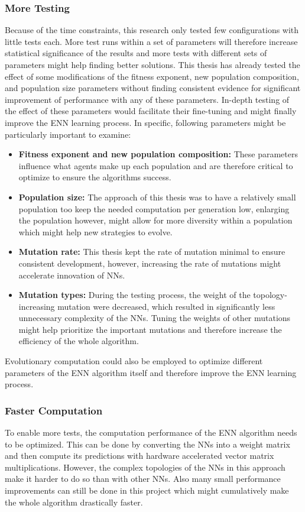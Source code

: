 \subsubsection{More Testing}
Because of the time constraints, this research only tested few configurations with little tests each.
More test runs within a set of parameters will therefore increase statistical significance of the results and more tests with different sets of parameters might help finding better solutions.
This thesis has already tested the effect of some modifications of the fitness exponent, new population composition, and population size parameters without finding consistent evidence for significant improvement of performance with any of these parameters.
In-depth testing of the effect of these parameters would facilitate their fine-tuning and might finally improve the ENN learning process.
In specific, following parameters might be particularly important to examine:
\begin{itemize}
    \item \textbf{Fitness exponent and new population composition:} These parameters influence what agents make up each population and are therefore critical to optimize to ensure the algorithms success.
    \item \textbf{Population size:} The approach of this thesis was to have a relatively small population too keep the needed computation per generation low, enlarging the population however, might allow for more diversity within a population which might help new strategies to evolve.
    \item \textbf{Mutation rate:} This thesis kept the rate of mutation minimal to ensure consistent development, however, increasing the rate of mutations might accelerate innovation of NNs.
    \item \textbf{Mutation types:} During the testing process, the weight of the topology-increasing mutation were decreased, which resulted in significantly less unnecessary complexity of the NNs.
    Tuning the weights of other mutations might help prioritize the important mutations and therefore increase the efficiency of the whole algorithm.
\end{itemize}
Evolutionary computation could also be employed to optimize different parameters of the ENN algorithm itself and therefore improve the ENN learning process.

\subsubsection{Faster Computation}
To enable more tests, the computation performance of the ENN algorithm needs to be optimized.
This can be done by converting the NNs into a weight matrix and then compute its predictions with hardware accelerated vector matrix multiplications.
However, the complex topologies of the NNs in this approach make it harder to do so than with other NNs.
Also many small performance improvements can still be done in this project which might cumulatively make the whole algorithm drastically faster.

